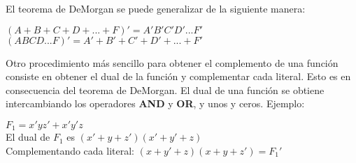 El teorema de DeMorgan se puede generalizar de la siguiente manera:
\begin{center} $(A + B + C + D + ... + F)' = A'B'C'D'...F'$ \\ $(ABCD...F)' = A'
        + B' + C' + D' + ... + F'$ \end{center}

Otro procedimiento m\'{a}s sencillo para obtener el complemento de una
funci\'{o}n consiste en obtener el dual de la funci\'{o}n y complementar cada
literal. Esto es en consecuencia del teorema de DeMorgan. El dual de una
funci\'{o}n se obtiene intercambiando los operadores \textbf{AND} y \textbf{OR},
y unos y ceros. Ejemplo: \begin{flushleft} $F_1 = x'yz' + x'y'z$ \\ El dual de
    $F_1$ es $(x' + y + z')(x' + y' + z)$ \\ Complementando cada literal: $(x + y' +
        z)(x + y + z') = F_1'$ \end{flushleft} \newpage

